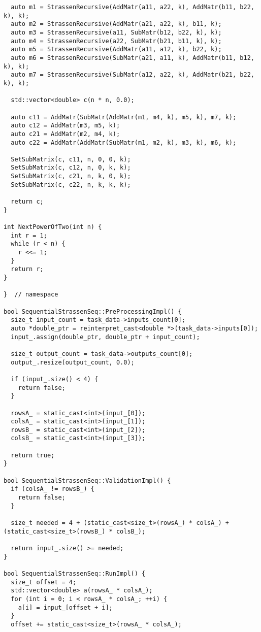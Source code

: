 \documentclass[12pt]{article}
\begin{document}
\begin{lstlisting}
  auto m1 = StrassenRecursive(AddMatr(a11, a22, k), AddMatr(b11, b22, k), k);
  auto m2 = StrassenRecursive(AddMatr(a21, a22, k), b11, k);
  auto m3 = StrassenRecursive(a11, SubMatr(b12, b22, k), k);
  auto m4 = StrassenRecursive(a22, SubMatr(b21, b11, k), k);
  auto m5 = StrassenRecursive(AddMatr(a11, a12, k), b22, k);
  auto m6 = StrassenRecursive(SubMatr(a21, a11, k), AddMatr(b11, b12, k), k);
  auto m7 = StrassenRecursive(SubMatr(a12, a22, k), AddMatr(b21, b22, k), k);

  std::vector<double> c(n * n, 0.0);

  auto c11 = AddMatr(SubMatr(AddMatr(m1, m4, k), m5, k), m7, k);
  auto c12 = AddMatr(m3, m5, k);
  auto c21 = AddMatr(m2, m4, k);
  auto c22 = AddMatr(AddMatr(SubMatr(m1, m2, k), m3, k), m6, k);

  SetSubMatrix(c, c11, n, 0, 0, k);
  SetSubMatrix(c, c12, n, 0, k, k);
  SetSubMatrix(c, c21, n, k, 0, k);
  SetSubMatrix(c, c22, n, k, k, k);

  return c;
}

int NextPowerOfTwo(int n) {
  int r = 1;
  while (r < n) {
    r <<= 1;
  }
  return r;
}

}  // namespace

bool SequentialStrassenSeq::PreProcessingImpl() {
  size_t input_count = task_data->inputs_count[0];
  auto *double_ptr = reinterpret_cast<double *>(task_data->inputs[0]);
  input_.assign(double_ptr, double_ptr + input_count);

  size_t output_count = task_data->outputs_count[0];
  output_.resize(output_count, 0.0);

  if (input_.size() < 4) {
    return false;
  }

  rowsA_ = static_cast<int>(input_[0]);
  colsA_ = static_cast<int>(input_[1]);
  rowsB_ = static_cast<int>(input_[2]);
  colsB_ = static_cast<int>(input_[3]);

  return true;
}

bool SequentialStrassenSeq::ValidationImpl() {
  if (colsA_ != rowsB_) {
    return false;
  }

  size_t needed = 4 + (static_cast<size_t>(rowsA_) * colsA_) + (static_cast<size_t>(rowsB_) * colsB_);

  return input_.size() >= needed;
}

bool SequentialStrassenSeq::RunImpl() {
  size_t offset = 4;
  std::vector<double> a(rowsA_ * colsA_);
  for (int i = 0; i < rowsA_ * colsA_; ++i) {
    a[i] = input_[offset + i];
  }
  offset += static_cast<size_t>(rowsA_ * colsA_);


\end{lstlisting}
\end{document}
